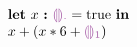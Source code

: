 

\newcommand{\THole}{\ensuremath{\SyEHole{\cdot}}}

\newcommand{\ELet}[2]{\ensuremath{\SyLet #1 = #2}}
\newcommand{\ELetAnn}[3]{\ensuremath{\SyLet #1 \SyColon #2 = #3}}
\newcommand{\EInn}{\ensuremath{\SyInn}}
\newcommand{\EPlus}[2]{\ensuremath{#1 \SyPlus #2}}
\newcommand{\ETimes}[2]{\ensuremath{#1 \SyTimes #2}}

\newcommand{\ETrue}{\ensuremath{\SyTrue}}
\newcommand{\EEHole}[1]{\ensuremath{\SyEHole{#1}}}


  \[\begin{array}{l}
    \ELetAnn{x}{\THole}{\ETrue} \EInn \\
    \EPlus{x}{(\EPlus{\ETimes{x}{6}}{\EEHole{1}})}
  \end{array}\]

